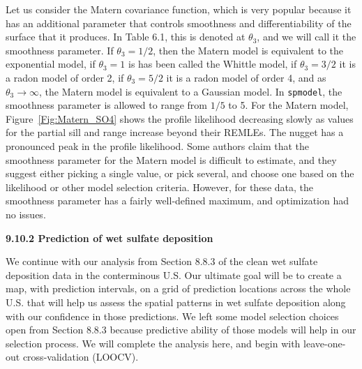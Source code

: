 \documentclass[12pt, titlepage]{article}
\begin{document}
Let us consider the Matern covariance function, which is very popular because it has an additional parameter that controls smoothness and differentiability of the surface that it produces.  In Table 6.1, this is denoted at $\theta_{3}$, and we will call it the smoothness parameter. If $\theta_{3} = 1/2$, then the Matern model is equivalent to the exponential model, if $\theta_{3} = 1$ is has been called the Whittle model, if $\theta_{3} = 3/2$ it is a radon model of order 2, if $\theta_{3} = 5/2$ it is a radon model of order 4, and as $\theta_{3} \rightarrow \infty$, the Matern model is equivalent to a Gaussian model.  In \texttt{spmodel}, the smoothness parameter is allowed to range from $1/5$ to 5.  For the Matern model, Figure~\ref{Fig:Matern_SO4}  shows the profile likelihood decreasing slowly as values for the partial sill and range increase beyond their REMLEs.  The nugget has a pronounced peak in the profile likelihood.  Some authors claim that the smoothness parameter for the Matern model is difficult to estimate, and they suggest either picking a single value, or pick several, and choose one based on the likelihood or other model selection criteria.  However, for these data, the smoothness parameter has a fairly well-defined maximum, and optimization had no issues.

\vspace{.3cm}

{\large \flushleft \textbf{9.10.2 Prediction of wet sulfate deposition}}

\vspace{.3cm}

We continue with our analysis from Section 8.8.3 of the clean wet sulfate deposition data in the conterminous U.S.  Our ultimate goal will be to create a map, with prediction intervals, on a grid of prediction locations across the whole U.S. that will help us assess the spatial patterns in wet sulfate deposition along with our confidence in those predictions.  We left some model selection choices open from Section 8.8.3 because predictive ability of those models will help in our selection process.  We will complete the analysis here, and begin with leave-one-out cross-validation (LOOCV).
\end{document}
